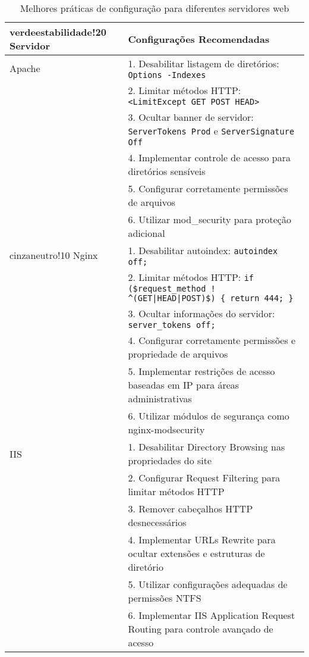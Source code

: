 \documentclass[12pt,a4paper]{book}
\begin{document}
\begin{table}[h]
\centering
\begin{tabular}{|p{4cm}|p{11cm}|}
\hline
{verdeestabilidade!20} \textbf{Servidor} & \textbf{Configurações Recomendadas} \\
\hline
Apache & 1. Desabilitar listagem de diretórios: \texttt{Options -Indexes} \\
& 2. Limitar métodos HTTP: \texttt{<LimitExcept GET POST HEAD>} \\
& 3. Ocultar banner de servidor: \texttt{ServerTokens Prod} e \texttt{ServerSignature Off} \\
& 4. Implementar controle de acesso para diretórios sensíveis \\
& 5. Configurar corretamente permissões de arquivos \\
& 6. Utilizar mod\_security para proteção adicional \\
\hline
{cinzaneutro!10} Nginx & 1. Desabilitar autoindex: \texttt{autoindex off;} \\
& 2. Limitar métodos HTTP: \texttt{if (\$request\_method !~ ^(GET|HEAD|POST)\$) \{ return 444; \}} \\
& 3. Ocultar informações do servidor: \texttt{server\_tokens off;} \\
& 4. Configurar corretamente permissões e propriedade de arquivos \\
& 5. Implementar restrições de acesso baseadas em IP para áreas administrativas \\
& 6. Utilizar módulos de segurança como nginx-modsecurity \\
\hline
IIS & 1. Desabilitar Directory Browsing nas propriedades do site \\
& 2. Configurar Request Filtering para limitar métodos HTTP \\
& 3. Remover cabeçalhos HTTP desnecessários \\
& 4. Implementar URLs Rewrite para ocultar extensões e estruturas de diretório \\
& 5. Utilizar configurações adequadas de permissões NTFS \\
& 6. Implementar IIS Application Request Routing para controle avançado de acesso \\
\hline
\end{tabular}
\caption{Melhores práticas de configuração para diferentes servidores web}
\end{table}
\end{document}
